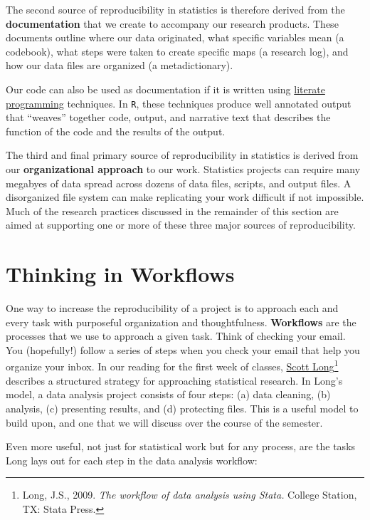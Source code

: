 \documentclass[]{book}
\let\rmarkdownfootnote\footnote%
\def\footnote{\protect\rmarkdownfootnote}
\theoremstyle{definition}
\theoremstyle{definition}
\theoremstyle{definition}
\theoremstyle{remark}
\begin{document}
The second source of reproducibility in statistics is therefore derived
from the \textbf{documentation} that we create to accompany our research
products. These documents outline where our data originated, what
specific variables mean (a codebook), what steps were taken to create
specific maps (a research log), and how our data files are organized (a
metadictionary).

Our code can also be used as documentation if it is written using
\href{https://en.wikipedia.org/wiki/Literate_programming}{literate
programming} techniques. In \texttt{R}, these techniques produce well
annotated output that ``weaves'' together code, output, and narrative
text that describes the function of the code and the results of the
output.

The third and final primary source of reproducibility in statistics is
derived from our \textbf{organizational approach} to our work.
Statistics projects can require many megabyes of data spread across
dozens of data files, scripts, and output files. A disorganized file
system can make replicating your work difficult if not impossible. Much
of the research practices discussed in the remainder of this section are
aimed at supporting one or more of these three major sources of
reproducibility.

\section{Thinking in Workflows}\label{thinking-in-workflows}

One way to increase the reproducibility of a project is to approach each
and every task with purposeful organization and thoughtfulness.
\textbf{Workflows} are the processes that we use to approach a given
task. Think of checking your email. You (hopefully!) follow a series of
steps when you check your email that help you organize your inbox. In
our reading for the first week of classes,
\href{http://www.indiana.edu/~jslsoc/}{Scott Long}\footnote{Long, J.S.,
  2009. \emph{The workflow of data analysis using Stata.} College
  Station, TX: Stata Press.} describes a structured strategy for
approaching statistical research. In Long's model, a data analysis
project consists of four steps: (a) data cleaning, (b) analysis, (c)
presenting results, and (d) protecting files. This is a useful model to
build upon, and one that we will discuss over the course of the
semester.

Even more useful, not just for statistical work but for any process, are
the tasks Long lays out for each step in the data analysis workflow:
\end{document}
